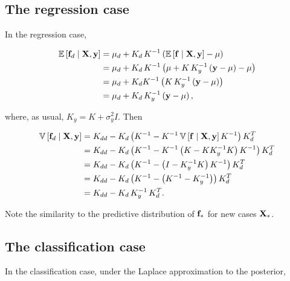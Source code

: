 \documentclass{draft}
\newcommand{\pd}{\ensuremath{\partial \,}}     %
\newcommand{\gradient}{\ensuremath{\mathbf{f}_d}} %
\begin{document}
\subsection{The regression case}

In the regression case,

\begin{align}
    \E \left[ \gradient \mid \mbf{X}, \mbf{y} \right]
    & = \mu_d + K_d \, K^{-1} \left( \E \left[ \mbf{f} \mid \mbf{X}, \mbf{y} \right] - \mu \right) \\
    & = \mu_d + K_d \, K^{-1}
        \left( \mu + K \, K_y^{-1} \left( \mbf{y} - \mu \right) - \mu \right) \\
    & = \mu_d + K_d K^{-1} \left( K \, K_y^{-1} \left( \mbf{y} - \mu \right) \right) \\
    & = \mu_d + K_d \, K_y^{-1} \left( \mbf{y} - \mu \right),
\end{align}

\noindent
where, as usual, \( K_y = K + \sigma_y^2 I \).
Then

\begin{align}
    \V \left[ \gradient \mid \mbf{X}, \mbf{y} \right]
    & = 
    K_{dd} - K_d \left( K^{-1} - K^{-1} \V \left[ \mbf{f} \mid \mbf{X}, \mbf{y} \right] K^{-1} \right) K_d^T \\
    & = 
    K_{dd} - K_d \left( K^{-1} - K^{-1} \left( K - K K_y^{-1} K \right) K^{-1} \right) K_d^T \\
    & = 
    K_{dd} - K_d \left( K^{-1} - \left( I - K_y^{-1} K \right) K^{-1} \right) K_d^T \\
    & = 
    K_{dd} - K_d \left( K^{-1} - \left( K^{-1} - K_y^{-1} \right) \right) K_d^T \\
    & = 
    K_{dd} - K_d \, K_y^{-1} \, K_d^T.
\end{align}

Note the similarity to the predictive distribution of \( \mathbf{f}_\ast \) for new cases \( \mathbf{X}_\ast \).

\subsection{The classification case}

In the classification case, under the Laplace approximation to the posterior,
\end{document}
